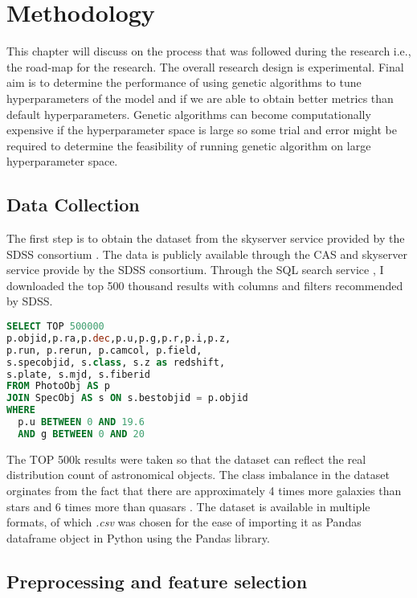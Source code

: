 \chapter{Methodology}
This chapter will discuss on the process that was followed during the research i.e., the road-map for the research. The overall research design is experimental. Final aim is to determine the performance of using genetic algorithms to tune hyperparameters of the model and if we are able to obtain better metrics than default hyperparameters. Genetic algorithms can become computationally expensive if the hyperparameter space is large so some trial and error might be required to determine the feasibility of running genetic algorithm on large hyperparameter space.

\section{Data Collection}

The first step is to obtain the dataset from the skyserver service provided by the SDSS consortium \citep{SDSSDR18}. The data is publicly available through the CAS and skyserver service provide by the SDSS consortium. Through the SQL search service \citep{SkyserverSDSS}, I downloaded the top 500 thousand results with columns and filters recommended by SDSS.

\begin{lstlisting}[language=SQL, caption = {SQL query to download data from SDSS Skyserver}, label = {lst:sqlquery}]
SELECT TOP 500000
p.objid,p.ra,p.dec,p.u,p.g,p.r,p.i,p.z,
p.run, p.rerun, p.camcol, p.field,
s.specobjid, s.class, s.z as redshift,
s.plate, s.mjd, s.fiberid
FROM PhotoObj AS p
JOIN SpecObj AS s ON s.bestobjid = p.objid
WHERE 
  p.u BETWEEN 0 AND 19.6
  AND g BETWEEN 0 AND 20
\end{lstlisting}

The TOP 500k results were taken so that the dataset can reflect the real distribution count of astronomical objects. The class imbalance in the dataset orginates from the fact that there are approximately 4 times more galaxies than stars and 6 times more than quasars \citep{Clarke2020}. The dataset is available in multiple formats, of which \textit{.csv} was chosen for the ease of importing it as Pandas dataframe object in Python using the Pandas library.

\section{Preprocessing and feature selection} 

